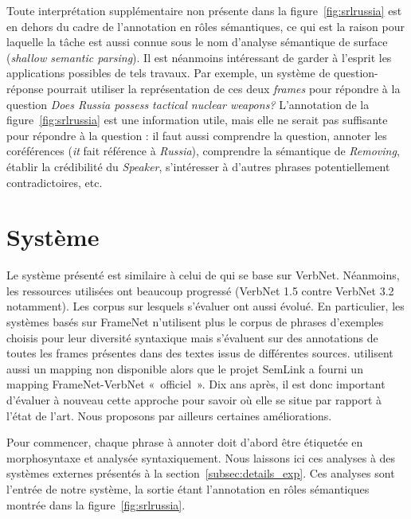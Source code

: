 Toute interprétation supplémentaire non présente dans la
figure~\ref{fig:srlrussia} est en dehors du cadre de l'annotation en rôles
sémantiques, ce qui est la raison pour laquelle la tâche est aussi connue sous
le nom d'analyse sémantique de surface (\textit{shallow semantic parsing}).  Il
est néanmoins intéressant de garder à l'esprit les applications possibles de
tels travaux. Par exemple, un système de question-réponse pourrait utiliser la
représentation de ces deux \textit{frames} pour répondre à la question \textit{Does
Russia possess tactical nuclear weapons?} L'annotation de la
figure~\ref{fig:srlrussia} est une information utile, mais elle ne serait pas
suffisante pour répondre à la question : il faut aussi comprendre la question,
annoter les coréférences (\textit{it} fait référence à \textit{Russia}), comprendre
la sémantique de \textit{Removing}, établir la crédibilité du \textit{Speaker},
s'intéresser à d'autres phrases potentiellement contradictoires, etc.

\section{Système}

Le système présenté est similaire à celui de
\cite{swier2004unsupervised,swier2005exploiting} qui se base sur VerbNet.
Néanmoins, les ressources utilisées ont beaucoup progressé (VerbNet 1.5 contre
VerbNet 3.2 notamment). Les corpus sur lesquels s'évaluer ont aussi évolué. En
particulier, les systèmes basés sur FrameNet n'utilisent plus le corpus de
phrases d'exemples choisis pour leur diversité syntaxique mais s'évaluent sur
des annotations de toutes les frames présentes dans des textes issus de
différentes sources. \cite{swier2005exploiting} utilisent aussi un mapping non
disponible alors que le projet SemLink a fourni un mapping FrameNet-VerbNet
«~officiel~». Dix ans après, il est donc important d'évaluer à nouveau cette
approche pour savoir où elle se situe par rapport à l'état de l'art. Nous
proposons par ailleurs certaines améliorations.

Pour commencer, chaque phrase à annoter doit d'abord être étiquetée en
morphosyntaxe et analysée syntaxiquement. Nous laissons ici ces analyses à des
systèmes externes présentés à la section~\ref{subsec:details_exp}. Ces analyses
sont l'entrée de notre système, la sortie étant l'annotation en rôles
sémantiques montrée dans la figure~\ref{fig:srlrussia}.

